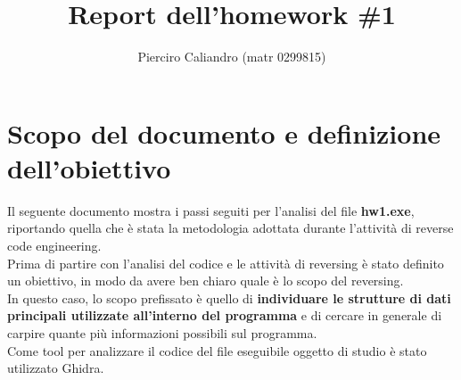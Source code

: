 \documentclass[12pt]{extarticle}
\author{Pierciro Caliandro (matr 0299815)}
\title{Report dell'homework \#1}
\date{}
\begin{document}
\maketitle
\section{Scopo del documento e definizione dell'obiettivo}
Il seguente documento mostra i passi seguiti per l'analisi del file \textbf{hw1.exe}, riportando quella che è stata la metodologia adottata durante l'attività di reverse code engineering.\\
Prima di partire con l'analisi del codice e le attività di reversing è stato definito un obiettivo, in modo da avere ben chiaro quale è lo scopo del reversing.\\ In questo caso, lo scopo prefissato è quello di \textbf{individuare le strutture di dati principali utilizzate all'interno del programma} e di cercare in generale di carpire quante più informazioni possibili sul programma.\\ Come tool per analizzare il codice del file eseguibile oggetto di studio è stato utilizzato Ghidra.
\end{document}

